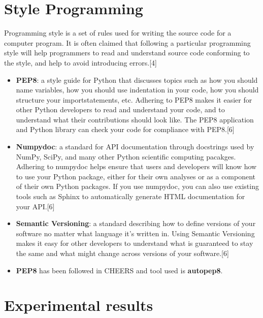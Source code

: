 \documentclass[11pt]{article}
\begin{document}
\section{Style Programming}

		Programming style is a set of rules used for writing the source code for a computer program. It is often claimed that following a particular programming style will help programmers to read and understand source code conforming to the style, and help to avoid introducing errors.[4]\\
		
		\begin{itemize}
			\item  \textbf{PEP8}: a style guide for Python that discusses topics such as how you should name variables, how you should use indentation in your code, how you should structure your importstatements, etc. Adhering to PEP8 makes it easier for other Python developers to read and understand your code, and to understand what their contributions should look like. The PEP8 application and Python library can check your code for compliance with PEP8.[6]\\
			
			\item \textbf{Numpydoc}: a standard for API documentation through docstrings used by NumPy, SciPy, and many other Python scientific computing pacakges. Adhering to numpydoc helps ensure that users and developers will know how to use your Python package, either for their own analyses or as a component of their own Python packages. If you use numpydoc, you can also use existing tools such as Sphinx to automatically generate HTML documentation for your API.[6]\\
			
			\item \textbf{Semantic Versioning}: a standard describing how to define versions of your software no matter what language it’s written in. Using Semantic Versioning makes it easy for other developers to understand what is guaranteed to stay the same and what might change across versions of your software.[6]\\
			
			\item \textbf{PEP8} has been followed in CHEERS and tool used is \textbf{autopep8}.
		\end{itemize}

\newpage
\section{Experimental results}	
\end{document}
